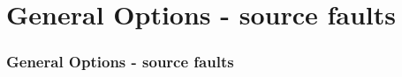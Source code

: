 \section[General arg]{General Options - source faults}

\graphicspath{{Chapter4/Figs/Vector/}}

\begin{frame}
  \frametitle{General Options - source faults}
  \framesubtitle{}
  \label{fr4:hist_pics}

\end{frame}
\note{}
